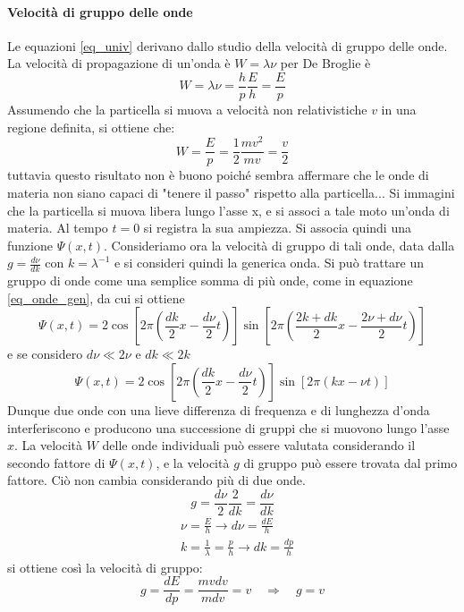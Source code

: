 \paragraph{Velocità di gruppo delle onde}
Le equazioni \ref{eq_univ} derivano dallo studio della velocità di gruppo delle onde.
La velocità di propagazione di un'onda è $W=\lambda \nu$ per De Broglie è $$W = \lambda \nu = \frac{h}{p} \frac{E}{h} = \frac{E}{p}$$
Assumendo che la particella si muova a velocità non relativistiche $v$ in una regione definita, si ottiene che:
\begin{equation}
W = \frac{E}{p} = \frac{1}{2} \frac{m v^2}{m v} = \frac{v}{2}
\end{equation}
tuttavia questo risultato non è buono poiché sembra affermare che le onde di materia non siano capaci di "tenere il passo" rispetto alla particella...
Si immagini che la particella si muova libera lungo l'asse x, e si associ a tale moto un'onda di materia. Al tempo $t=0$ si registra la sua ampiezza.
Si associa quindi una funzione $\Psi (x,t)$.
Consideriamo ora la velocità di gruppo di tali onde, data dalla $g=\frac{d \nu}{d k}$ con $k= \lambda^{-1}$ e si consideri quindi la generica onda.
Si può trattare un gruppo di onde come una semplice somma di più onde, come in equazione \ref{eq_onde_gen}, da cui si ottiene 
\begin{equation}
\Psi (x, t) = 2 \cos [ 2 \pi ( \frac{dk}{2} x - \frac{d\nu}{2} t ) ] \sin [ 2\pi ( \frac{2k + dk}{2} x - \frac{2\nu + d\nu}{2} t ) ]  
\end{equation}
e se considero $ d\nu \ll 2\nu $ e $ dk \ll 2k $
\begin{equation}
 \Psi (x, t) = 2 \cos [ 2 \pi ( \frac{dk}{2} x - \frac{d\nu}{2} t ) ] \sin [ 2 \pi ( k x - \nu t )] 
\end{equation}
Dunque due onde con una lieve differenza di frequenza e di lunghezza d'onda interferiscono e producono una successione di gruppi che si muovono lungo l'asse $x$.
La velocità $W$ delle onde individuali può essere valutata considerando il secondo fattore di $\Psi (x, t)$, e la velocità $g$ di gruppo può essere trovata dal primo fattore.
Ciò non cambia considerando più di due onde.
$$ g = \frac{d\nu}{2}\frac{2}{dk} = \frac{d\nu}{dk} $$
\begin{equation}
\begin{split}
& \nu= \frac{E}{h} \rightarrow d\nu = \frac{d E}{h} \\
& k = \frac{1}{\lambda} = \frac{p}{h} \rightarrow dk=\frac{d p}{h}
\end{split}
\end{equation}
si ottiene così la velocità di gruppo: 
\begin{equation}
g = \frac{d E}{d p} = \frac{m v dv}{m dv} = v 
\quad\Rightarrow\quad  g = v
\end{equation}





